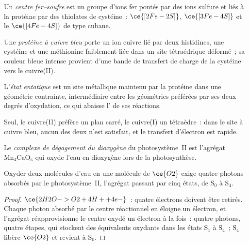 \begin{definition}\label{def:b3:bioinorganic:fes}
Un \emph{centre fer--soufre} est un groupe d'ions
fer pontés par des ions sulfure et liés à la protéine par des thiolates de
cystéine~: $\ce{[2Fe-2S]}$, $\ce{[3Fe-4S]}$ et le $\ce{[4Fe-4S]}$ de type cubane.
\end{definition}

\begin{definition}\label{def:b3:bioinorganic:blue-copper}
Une \emph{protéine à cuivre bleu} porte un ion cuivre
lié par deux histidines, une cystéine et une méthionine faiblement liée dans
un site tétraédrique déformé~; sa couleur bleue intense provient d'une
bande de transfert de charge de la cystéine vers le cuivre(II).
\end{definition}

\begin{definition}\label{def:b3:bioinorganic:entatic}
L'\emph{état entatique} est un site métallique maintenu par la
protéine dans une géométrie contrainte, intermédiaire entre les géométries
préférées par ses deux degrés d'oxydation, ce qui abaisse l' de ses réactions.
\end{definition}

Seul, le cuivre(II) préfère un plan carré, le cuivre(I) un tétraèdre~: dans
le site à cuivre bleu, aucun des deux n'est satisfait, et le transfert
d'électron est rapide.

\begin{definition}\label{def:b3:bioinorganic:oec}
Le \emph{complexe de dégagement du dioxygène} du
photosystème~II est l'agrégat $\mathrm{Mn_4CaO_5}$ qui oxyde l'eau en dioxygène lors de la
photosynthèse.
\end{definition}

\begin{proposition}\label{prop:b3:bioinorganic:kok}
Oxyder deux molécules d'eau en une molécule de $\ce{O2}$ exige quatre photons absorbés par
le photosystème~II, l'agrégat passant par cinq états, de $\mathrm S_0$ à $\mathrm S_4$.
\end{proposition}

\begin{proof}
$\ce{2H2O -> O2 + 4H+ + 4e-}$~: quatre électrons doivent être retirés. Chaque photon absorbé par le
centre réactionnel en éloigne un électron, et l'agrégat réapprovisionne le
centre oxydé un électron à la fois~: quatre photons, quatre étapes, qui
stockent des équivalents oxydants dans les états $\mathrm S_1$ à $\mathrm S_4$~; $\mathrm S_4$ libère $\ce{O2}$ et revient à $\mathrm S_0$.
\end{proof}

